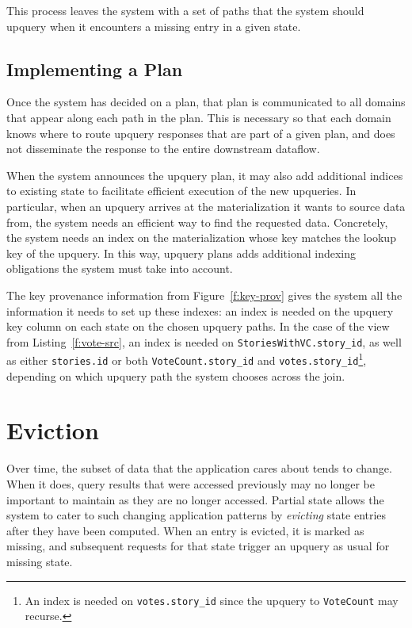 This process leaves the system with a set of paths that the system should
upquery when it encounters a missing entry in a given state.

\subsection{Implementing a Plan}

Once the system has decided on a plan, that plan is communicated to all domains
that appear along each path in the plan. This is necessary so that each domain
knows where to route upquery responses that are part of a given plan, and does
not disseminate the response to the entire downstream dataflow.

When the system announces the upquery plan, it may also add additional indices
to existing state to facilitate efficient execution of the new upqueries. In
particular, when an upquery arrives at the materialization it wants to source
data from, the system needs an efficient way to find the requested data.
Concretely, the system needs an index on the materialization whose key matches
the lookup key of the upquery. In this way, upquery plans adds additional
indexing obligations the system must take into account.

The key provenance information from Figure~\ref{f:key-prov} gives the system all
the information it needs to set up these indexes: an index is needed on the
upquery key column on each state on the chosen upquery paths. In the case of the
view from Listing~\ref{f:vote-src}, an index is needed on
\texttt{StoriesWithVC.story\_id}, as well as either \texttt{stories.id} or both
\texttt{VoteCount.story\_id} and \texttt{votes.story\_id}\footnote{An index is
needed on \texttt{votes.story\_id} since the upquery to \texttt{VoteCount} may
recurse.}, depending on which upquery path the system chooses across the join.

\section{Eviction}

Over time, the subset of data that the application cares about tends to change.
When it does, query results that were accessed previously may no longer be
important to maintain as they are no longer accessed. Partial state allows the
system to cater to such changing application patterns by \textit{evicting} state
entries after they have been computed. When an entry is evicted, it is marked as
missing, and subsequent requests for that state trigger an upquery as usual for
missing state.

